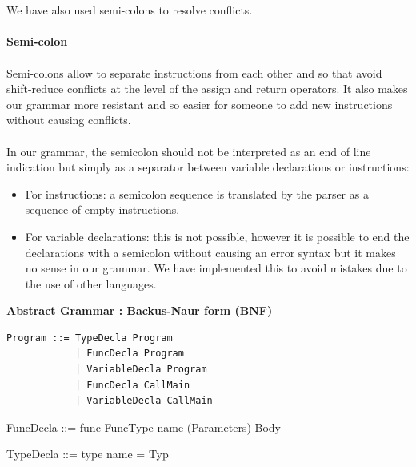 \documentclass[11pt]{report}
\begin{document}
\\ \\
\newpage
We have also used semi-colons to resolve conflicts. \\ \\
\tabto{2cm} \textbf{Semi-colon} \\ \\
\tabto{1cm}Semi-colons allow to separate instructions from each other and so that avoid shift-reduce conflicts at the level of the assign and return operators. It also makes our grammar more resistant and so easier for someone to add new instructions without causing conflicts. \\ \\
\tabto{1cm} In our grammar, the semicolon should not be interpreted as an end of line indication but simply as a separator between variable declarations or instructions:
\begin{itemize}
\item For instructions: a semicolon sequence is translated by the parser as a sequence of empty instructions.
\item For variable declarations: this is not possible, however it is possible to end the declarations with a semicolon without causing an error syntax but it makes no sense in our grammar. We have implemented this to avoid mistakes due to the use of other languages.
\end{itemize}


\newpage
\centerline{\textbf{\Huge Abstract Grammar : Backus-Naur form (BNF)}}
\vspace*{20 pt}
\vspace*{3pt}
\begin{Verbatim}[fontfamily=textsf]
Program ::= TypeDecla Program
            | FuncDecla Program
            | VariableDecla Program
            | FuncDecla CallMain
            | VariableDecla CallMain
\end{Verbatim}
\vspace*{3pt}

\begin{verbnobox}[\normalfont]
FuncDecla ::= func FuncType name (Parameters) Body
\end{verbnobox}
\vspace*{3pt}

\begin{verbnobox}[\normalfont]
TypeDecla ::= type name = Typ
\end{verbnobox}
\vspace*{3pt}
\end{document}
